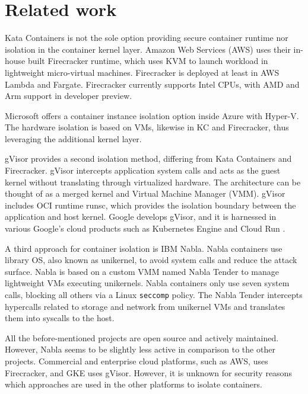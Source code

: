 \section{Related work}

Kata Containers is not the sole option providing secure container runtime nor isolation in the container kernel layer. Amazon Web Services (AWS) uses their in-house built Firecracker runtime, which uses KVM to launch workload in lightweight micro-virtual machines. Firecracker is deployed at least in AWS Lambda and Fargate. Firecracker currently supports Intel CPUs, with AMD and Arm support in developer preview. \cite{AWS}\cite{Debab2021}

Microsoft offers a container instance isolation option inside Azure with Hyper-V. The hardware isolation is based on VMs, likewise in KC and Firecracker, thus leveraging the additional kernel layer. \cite{Hyper-V}

gVisor provides a second isolation method, differing from Kata Containers and Firecracker. gVisor intercepts application system calls and acts as the guest kernel without translating through virtualized hardware. The architecture can be thought of as a merged kernel and Virtual Machine Manager (VMM). gVisor includes OCI runtime runsc, which provides the isolation boundary between the application and host kernel. Google develops gVisor, and it is harnessed in various Google's cloud products such as Kubernetes Engine \cite{GKE} and Cloud Run \cite{CloudRun}. \cite{gVisor}\cite{Debab2021}

A third approach for container isolation is IBM Nabla\cite{Nabla}. Nabla containers use library OS, also known as unikernel, to avoid system calls and reduce the attack surface. Nabla is based on a custom VMM named Nabla Tender to manage lightweight VMs executing unikernels. Nabla containers only use seven system calls, blocking all others via a Linux \texttt{seccomp} policy. The Nabla Tender intercepts hypercalls related to storage and network from unikernel VMs and translates them into syscalls to the host. \cite{Debab2021}

All the before-mentioned projects are open source and actively maintained. However, Nabla seems to be slightly less active in comparison to the other projects. Commercial and enterprise cloud platforms, such as AWS, uses Firecracker, and GKE uses gVisor. However, it is unknown for security reasons which approaches are used in the other platforms to isolate containers.


